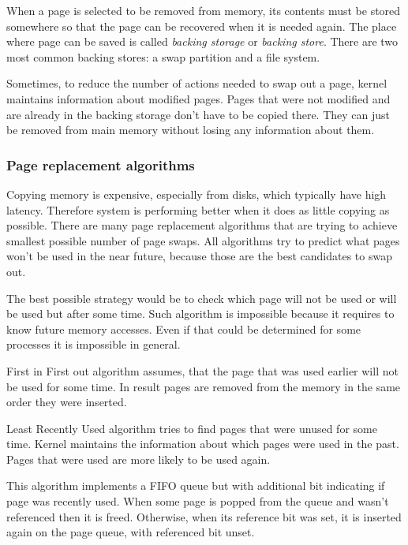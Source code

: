 When a page is selected to be removed from memory, its contents must be stored somewhere so that the page can be recovered when it is needed again.
The place where page can be saved is called {\it backing storage} or {\it backing store}.
There are two most common backing stores: a swap partition and a file system.

Sometimes, to reduce the number of actions needed to swap out a page, kernel maintains information about modified pages.
Pages that were not modified and are already in the backing storage don't have to be copied there.
They can just be removed from main memory without losing any information about them.

\subsubsection{Page replacement algorithms}

Copying memory is expensive, especially from disks, which typically have high latency.
Therefore system is performing better when it does as little copying as possible.
There are many page replacement algorithms that are trying to achieve smallest possible number of page swaps.
All algorithms try to predict what pages won't be used in the near future, because those are the best candidates to swap out.

\begin{description}[style=nextline]
  \item[Optimal]
    The best possible strategy would be to check which page will not be used or will be used but after some time.
    Such algorithm is impossible because it requires to know future memory accesses.
    Even if that could be determined for some processes it is impossible in general.

  \item[FIFO]
    First in First out algorithm assumes, that the page that was used earlier will not be used for some time.
    In result pages are removed from the memory in the same order they were inserted.

  \item[LRU]
    Least Recently Used algorithm tries to find pages that were unused for some time.
    Kernel maintains the information about which pages were used in the past.
    Pages that were used are more likely to be used again.

  \item[Second chance]
    This algorithm implements a FIFO queue but with additional bit indicating if page was recently used.
    When some page is popped from the queue and wasn't referenced then it is freed.
    Otherwise, when its reference bit was set, it is inserted again on the page queue, with referenced bit unset.

\end{description}

